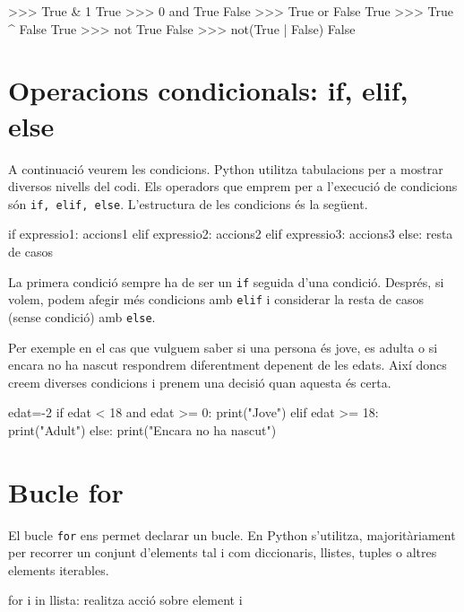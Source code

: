 \begin{tip}[caption=Operador lògics]
>>> True & 1
True
>>> 0 and True
False
>>> True or False
True
>>> True ^ False
True
>>> not True
False
>>> not(True | False)
False
\end{tip}




\section{Operacions condicionals: if, elif, else}

A continuació veurem les condicions. Python utilitza tabulacions per a mostrar diversos nivells del codi. Els operadors que emprem per a l'execució de condicions són {\tt if, elif, else}. L'estructura de les condicions és la següent.

\begin{blockcode}
if expressio1:
   accions1
elif expressio2:
   accions2
elif expressio3:
   accions3
else:
   resta de casos
\end{blockcode}

La primera condició sempre ha de ser un {\tt if} seguida d'una condició. Després, si volem, podem afegir més condicions amb {\tt elif} i considerar la resta de casos (sense condició) amb {\tt else}.

Per exemple en el cas que vulguem saber si una persona és jove, es adulta o si encara no ha nascut respondrem diferentment depenent de les edats. Així doncs creem diverses condicions i prenem una decisió quan aquesta és certa. 

\begin{tip}[caption=Rangs d'edats]
edat=-2
if edat < 18 and edat >= 0:
   print("Jove")
elif edat >= 18:
   print("Adult")
else:
   print("Encara no ha nascut")
\end{tip}




\section{Bucle for}

El bucle {\tt for} ens permet declarar un bucle. En Python s'utilitza, majoritàriament per recorrer un conjunt d'elements tal i com diccionaris, llistes, tuples o altres elements iterables.

\begin{blockcode}
for i in llista:
    realitza acció sobre element i
\end{blockcode}

